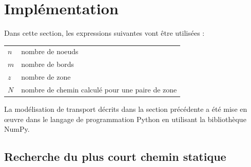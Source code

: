 


\section{Implémentation}




Dans cette section, les expressions suivantes vont être utilisées :

\begin{tabular}{ll}
  $n$ & nombre de noeuds\\
  $m$ & nombre de bords \\
  $z$ & nombre de zone\\
  $N$ & nombre de chemin calculé pour une paire de zone
\end{tabular}

La modélisation de transport décrits dans la section précédente a été mise en œuvre dans le langage de programmation Python en utilisant la bibliothèque NumPy.



\subsection{Recherche du plus court chemin statique}

